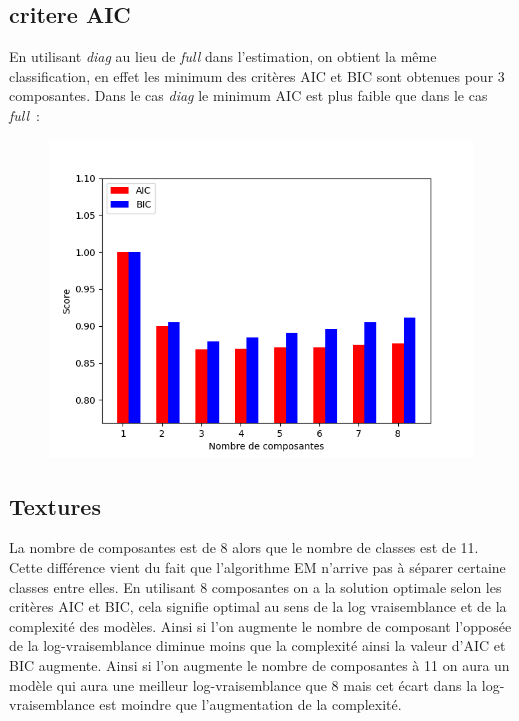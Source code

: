 \documentclass[12pt]{scrartcl} %
\begin{document}
\subsection{critere AIC}
En utilisant \textit{diag} au lieu de \textit{full} dans l'estimation, on obtient la même classification, en effet les minimum des critères AIC et BIC sont obtenues pour 3 composantes. Dans le cas \textit{diag} le minimum AIC est plus faible que dans le cas \textit{full}~:
\newline
\begin{figure}[!h]
 \centering 
\includegraphics[scale=.3]{barAIC.png}
\end{figure}
\newline 
\subsection{Textures}
La nombre de composantes est de 8 alors que le nombre de classes est de 11. Cette différence vient du fait que l'algorithme EM n'arrive pas à séparer certaine classes entre elles. En utilisant 8 composantes on a la solution optimale selon les critères AIC et BIC, cela signifie optimal au sens de la log vraisemblance et de la complexité des modèles. Ainsi si l'on augmente le nombre de composant  l'opposée de la log-vraisemblance diminue moins que la complexité ainsi la valeur d'AIC et BIC augmente. Ainsi si l'on augmente le nombre de composantes à 11 on aura un modèle qui aura une meilleur log-vraisemblance que 8 mais cet écart dans la log-vraisemblance est moindre que l'augmentation de la complexité.
\end{document}
